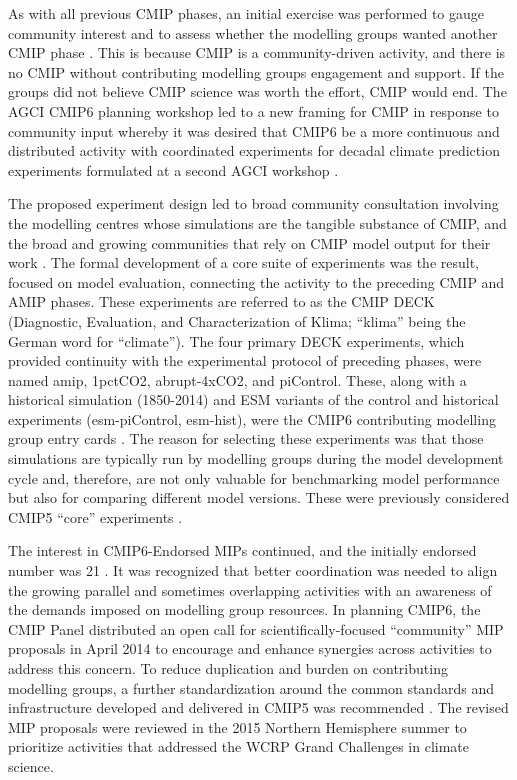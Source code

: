 \documentclass[manuscript]{copernicus}
\begin{document}
As with all previous CMIP phases, an initial exercise was performed to gauge community interest and to assess whether the modelling groups wanted another CMIP phase \citep{stouffer_cmip5_2017}. This is because CMIP is a community-driven activity, and there is no CMIP without contributing modelling groups engagement and support. If the groups did not believe CMIP science was worth the effort, CMIP would end. The AGCI CMIP6 planning workshop led to a new framing for CMIP in response to community input whereby it was desired that CMIP6 be a more continuous and distributed activity \citep{meehl_climate_2014} with coordinated experiments for decadal climate prediction experiments formulated at a second AGCI workshop \citep{meehl_decadal_2014}.

The proposed experiment design led to broad community consultation involving the modelling centres whose simulations are the tangible substance of CMIP, and the broad and growing communities that rely on CMIP model output for their work \citep{eyring_overview_2016}. The formal development of a core suite of experiments was the result, focused on model evaluation, connecting the activity to the preceding CMIP and AMIP phases. These experiments are referred to as the CMIP DECK (Diagnostic, Evaluation, and Characterization of Klima; ``klima'' being the German word for ``climate''). The four primary DECK experiments, which provided continuity with the experimental protocol of preceding phases, were named amip, 1pctCO2, abrupt-4xCO2, and piControl. These, along with a historical simulation (1850-2014) and ESM variants of the control and historical experiments (esm-piControl, esm-hist), were the CMIP6 contributing modelling group entry cards \citep{eyring_overview_2016}. The reason for selecting these experiments was that those simulations are typically run by modelling groups during the model development cycle and, therefore, are not only valuable for benchmarking model performance but also for comparing different model versions. These were previously considered CMIP5 ``core'' experiments \citep{stouffer_cmip5_2011}.

The interest in CMIP6-Endorsed MIPs continued, and the initially endorsed number was 21 \citep[\autoref{tab:tab2-CMIP6MIPs};][]{eyring_overview_2016}. It was recognized that better coordination was needed to align the growing parallel and sometimes overlapping activities with an awareness of the demands imposed on modelling group resources. In planning CMIP6, the CMIP Panel distributed an open call for scientifically-focused ``community'' MIP proposals in April 2014 to encourage and enhance synergies across activities to address this concern. To reduce duplication and burden on contributing modelling groups, a further standardization around the common standards and infrastructure developed and delivered in CMIP5 was recommended \citep{eyring_overview_2016}. The revised MIP proposals were reviewed in the 2015 Northern Hemisphere summer to prioritize activities that addressed the WCRP Grand Challenges in climate science.
\end{document}
